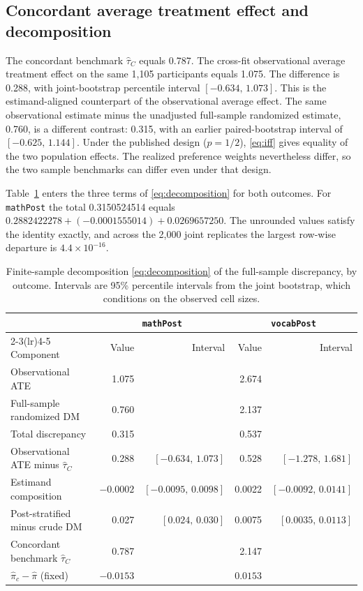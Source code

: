 \documentclass[twoside,11pt]{article}
\begin{document}
\subsection{Concordant average treatment effect and decomposition}

The concordant benchmark $\widehat\tau_C$ equals 0.787. The cross-fit observational average treatment effect on the same 1{,}105 participants equals 1.075. The difference is 0.288, with joint-bootstrap percentile interval $[-0.634,\,1.073]$. This is the estimand-aligned counterpart of the observational average effect. The same observational estimate minus the unadjusted full-sample randomized estimate, 0.760, is a different contrast: 0.315, with an earlier paired-bootstrap interval of $[-0.625,\,1.144]$. Under the published design ($p=1/2$), \eqref{eq:iff} gives equality of the two population effects. The realized preference weights nevertheless differ, so the two sample benchmarks can differ even under that design.

Table~\ref{tab:decomp} enters the three terms of \eqref{eq:decomposition} for both outcomes. For \texttt{mathPost} the total 0.3150524514 equals $0.2882422278+(-0.0001555014)+0.0269657250$. The unrounded values satisfy the identity exactly, and across the 2{,}000 joint replicates the largest row-wise departure is $4.4\times 10^{-16}$.

\begin{table}[htbp]
\centering
\caption{Finite-sample decomposition \eqref{eq:decomposition} of the full-sample discrepancy, by outcome. Intervals are 95\% percentile intervals from the joint bootstrap, which conditions on the observed cell sizes.}
\label{tab:decomp}
\small
\begin{tabular}{lrrrr}
\toprule
 & \multicolumn{2}{c}{\texttt{mathPost}} & \multicolumn{2}{c}{\texttt{vocabPost}} \\
\cmidrule(lr){2-3}\cmidrule(lr){4-5}
Component & Value & Interval & Value & Interval \\
\midrule
Observational ATE & 1.075 & & 2.674 & \\
Full-sample randomized DM & 0.760 & & 2.137 & \\
Total discrepancy & 0.315 & & 0.537 & \\
\midrule
Observational ATE minus $\widehat\tau_C$ & 0.288 & $[-0.634,\,1.073]$ & 0.528 & $[-1.278,\,1.681]$ \\
Estimand composition & $-0.0002$ & $[-0.0095,\,0.0098]$ & 0.0022 & $[-0.0092,\,0.0141]$ \\
Post-stratified minus crude DM & 0.027 & $[0.024,\,0.030]$ & 0.0075 & $[0.0035,\,0.0113]$ \\
\midrule
Concordant benchmark $\widehat\tau_C$ & 0.787 & & 2.147 & \\
$\widehat\pi_c-\widehat\pi$ (fixed) & $-0.0153$ & & $0.0153$ & \\
\bottomrule
\end{tabular}
\end{table}
\end{document}
